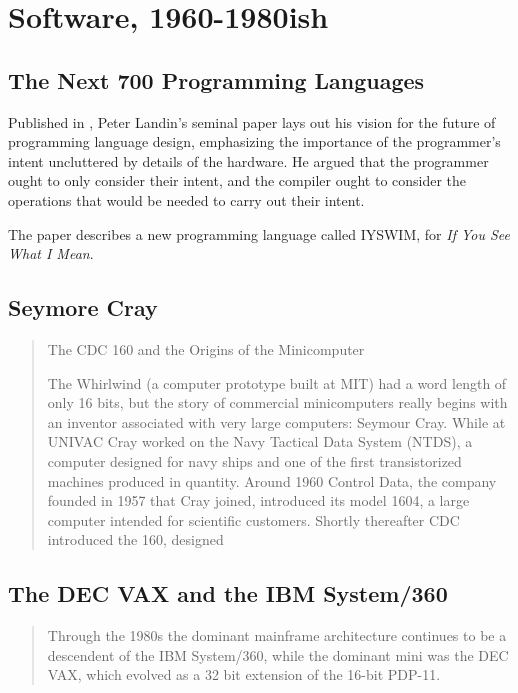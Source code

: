 
\chapter{Software, 1960-1980ish}





\section{The Next 700 Programming Languages}

Published in \citeyear{landin_next_700_prog_langs_1966},
Peter Landin's seminal paper  lays out his vision for
the future of programming language design, emphasizing the importance of the programmer's intent
uncluttered by details of the hardware.
He argued that the programmer ought to only consider their intent, and the compiler ought to
consider the operations that would be needed to carry out their intent.

The paper describes a new programming language called IYSWIM, for \textit{If You See What I Mean}.

\section{Seymore Cray}
\begin{quotation}
	The CDC 160 and the Origins of the Minicomputer

	The Whirlwind (a computer prototype built at
	MIT) had a word length of only 16 bits, but the story of commercial minicomputers really begins with
	an inventor associated with very large computers: Seymour Cray. While at UNIVAC Cray worked on the
	Navy Tactical Data System (NTDS), a computer designed for navy ships and one of the first
	transistorized machines produced in quantity. Around 1960 Control Data, the company founded in 1957
	that Cray joined, introduced its model 1604, a large computer intended for scientific customers.
	Shortly thereafter CDC introduced the 160, designed
	\cite{nothing_new_since_von_neumann_2000}
\end{quotation}

\section{The DEC VAX and the IBM System/360}
\begin{quotation}
	Through the 1980s the dominant mainframe architecture continues to be a descendent of the IBM
	System/360, while the dominant mini was the DEC VAX, which evolved as a 32 bit extension of the
	16-bit PDP-11.
	\cite{nothing_new_since_von_neumann_2000}
\end{quotation}
